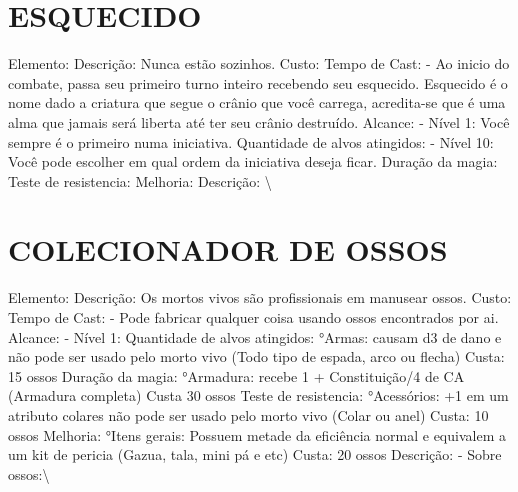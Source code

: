 \documentclass{article}%
\begin{document}
%
\section{ESQUECIDO}%
\label{sec:ESQUECIDO}%
Elemento: Descrição: Nunca estão sozinhos.\newline%
Custo: \newline%
Tempo de Cast: {-} Ao inicio do combate, passa seu primeiro turno inteiro recebendo seu esquecido. Esquecido é o nome dado a criatura que segue o crânio que você carrega, acredita{-}se que é uma alma que jamais será liberta até ter seu crânio destruído.\newline%
Alcance: {-} Nível 1:  Você sempre é o primeiro numa iniciativa.\newline%
Quantidade de alvos atingidos: {-} Nível 10:  Você pode escolher em qual ordem da iniciativa deseja ficar.\newline%
Duração da magia: \newline%
Teste de resistencia: \newline%
Melhoria: \newline%
Descrição: \textbackslash{}

%
\section{COLECIONADOR DE OSSOS}%
\label{sec:COLECIONADORDEOSSOS}%
Elemento: Descrição: Os mortos vivos são profissionais em manusear ossos.\newline%
Custo: \newline%
Tempo de Cast: {-} Pode fabricar qualquer coisa usando ossos encontrados por ai.\newline%
Alcance: {-} Nível 1:\newline%
Quantidade de alvos atingidos:   °Armas: causam d3 de dano e não pode ser usado pelo morto vivo (Todo tipo de espada, arco ou flecha) Custa: 15 ossos\newline%
Duração da magia:   °Armadura: recebe 1 + Constituição/4 de CA (Armadura completa) Custa 30 ossos\newline%
Teste de resistencia:   °Acessórios: +1 em um atributo colares não pode ser usado pelo morto vivo (Colar ou anel) Custa: 10 ossos\newline%
Melhoria:   °Itens gerais: Possuem metade da eficiência normal e equivalem a um kit de pericia (Gazua, tala, mini pá e etc) Custa: 20 ossos\newline%
Descrição: {-} Sobre ossos:\textbackslash{}
\end{document}
